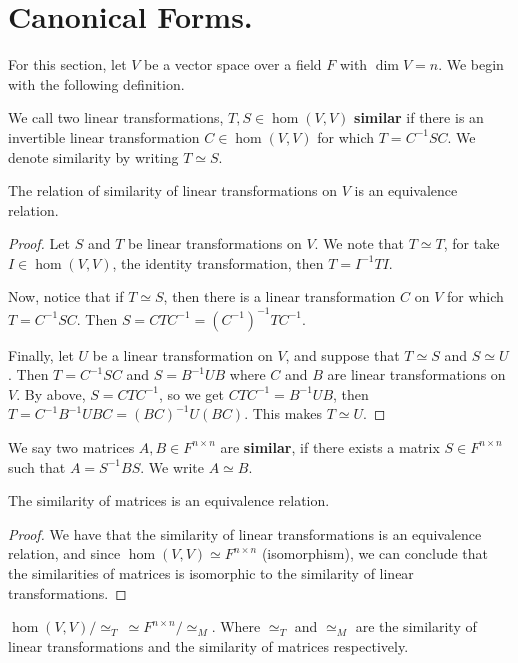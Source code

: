 \section{Canonical Forms.}

For this section, let $V$ be a vector space over a field  $F$ with $\dim{V}=n$.
We begin with the following definition.

\begin{definition}
    We call two linear transformations, $T,S \in \hom{(V,V)}$ \textbf{similar}
    if there is an invertible linear transformation $C \in \hom{(V,V)}$ for
    which $T=C^{-1}SC$. We denote similarity by writing $T \simeq S$.
\end{definition}

\begin{lemma}\label{3.4.1}
    The relation of similarity of linear transformations on $V$ is an
    equivalence relation.
\end{lemma}
\begin{proof}
    Let $S$ and  $T$ be linear transformations on  $V$. We note that  $T \simeq
    T$, for take $I \in \hom{(V,V)}$, the identity transformation, then
    $T=I^{-1}TI$.

    Now, notice that if $T \simeq S$, then there is a linear transformation $C$
    on  $V$ for which  $T = C^{-1}SC$. Then $S=CTC^{-1}=(C^{-1})^{-1}TC^{-1}$.

    Finally, let $U$ be a linear transformation on $V$, and suppose that $T
    \simeq S$ and  $S \simeq U$. Then  $T=C^{-1}SC$ and $S=B^{-1}UB$ where $C$
    and  $B$ are linear transformations on $V$. By above,  $S=CTC^{-1}$, so we
    get $CTC^{-1}=B^{-1}UB$, then $T=C^{-1}B^{-1}UBC=(BC)^{-1}U(BC)$. This
    makes $T \simeq U$.
\end{proof}

\begin{definition}
    We say two matrices $A,B \in F^{n \times n}$ are \textbf{similar}, if there
    exists a matrix $S \in F^{n \times n}$ such that $A=S^{-1}BS$. We
    write $A \simeq B$.
\end{definition}

\begin{lemma}\label{3.4.2}
    The similarity of matrices is an equivalence relation.
\end{lemma}
\begin{proof}
    We have that the similarity of linear transformations is an equivalence
    relation, and since $\hom{(V,V)} \simeq F^{n \times n}$ (isomorphism), we
    can conclude that the similarities of matrices is isomorphic to the
    similarity of linear transformations.
\end{proof}
\begin{corollary}
    $\hom{(V,V)}/\simeq_T \ \simeq F^{n \times n}/\simeq_M$. Where $\simeq_T$
    and  $\simeq_M$ are the similarity of linear transformations and the
    similarity of matrices respectively.
\end{corollary}

